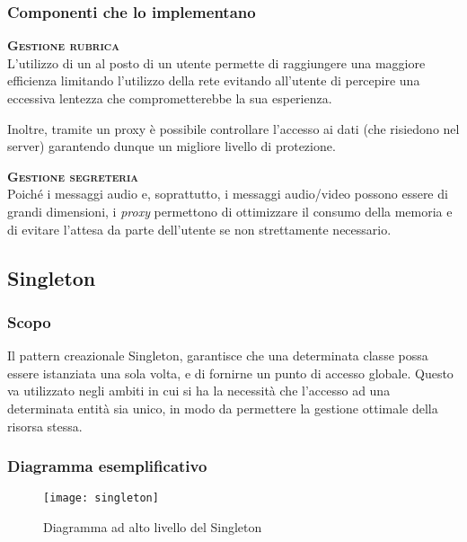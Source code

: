 \subsubsection{Componenti che lo implementano}
\begin{description}
  \item{\bfseries\scshape Gestione rubrica}\\
L'utilizzo di un  al posto di un utente permette di raggiungere una maggiore efficienza limitando l'utilizzo della rete evitando all'utente di percepire una eccessiva lentezza che comprometterebbe la sua esperienza.

Inoltre, tramite un proxy è possibile controllare l'accesso ai dati (che risiedono nel server) garantendo dunque un migliore livello di protezione.
  \item{\bfseries\scshape Gestione segreteria}\\
Poiché i messaggi audio e, soprattutto, i messaggi audio/video possono essere di grandi dimensioni, i \textit{proxy} permettono di ottimizzare il consumo della memoria e di evitare l'attesa da parte dell'utente se non strettamente necessario.
\end{description}

\subsection{Singleton}

\subsubsection{Scopo}
Il pattern creazionale Singleton, garantisce che una determinata classe possa essere istanziata una sola volta, e di fornirne un punto di accesso globale. Questo  va utilizzato negli ambiti in cui si ha la necessità che l'accesso ad una determinata entità sia unico, in modo da permettere la gestione ottimale della risorsa stessa.

\subsubsection{Diagramma esemplificativo}
\begin{figure}[H]
\centering
\texttt{[image: singleton]}
\caption{Diagramma ad alto livello del  Singleton}\label{fig:singleton}
\end{figure}


